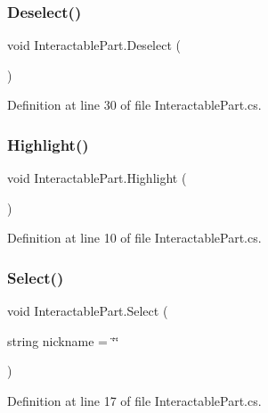 \subsubsection{\texorpdfstring{Deselect()}{Deselect()}}
{\footnotesize\ttfamily void Interactable\+Part.\+Deselect (\begin{DoxyParamCaption}{ }\end{DoxyParamCaption})}



Definition at line 30 of file Interactable\+Part.\+cs.

\mbox{\label{class_interactable_part_a2f585007164fdf0f03073740b4a24731}} 
\subsubsection{\texorpdfstring{Highlight()}{Highlight()}}
{\footnotesize\ttfamily void Interactable\+Part.\+Highlight (\begin{DoxyParamCaption}{ }\end{DoxyParamCaption})}



Definition at line 10 of file Interactable\+Part.\+cs.

\mbox{\label{class_interactable_part_a8d39a62c630d0e7b01821974356188f3}} 
\subsubsection{\texorpdfstring{Select()}{Select()}}
{\footnotesize\ttfamily void Interactable\+Part.\+Select (\begin{DoxyParamCaption}\item[{string}]{nickname = {\ttfamily \char`\"{}\char`\"{}} }\end{DoxyParamCaption})}



Definition at line 17 of file Interactable\+Part.\+cs.

\mbox{\label{class_interactable_part_a1babfa8c538301b50ff51843fae6e663}} 
